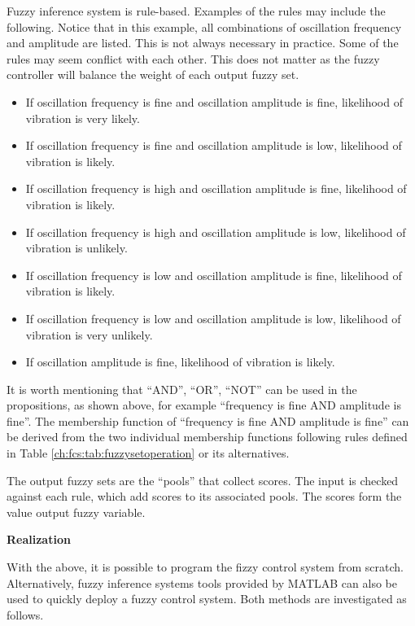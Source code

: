 Fuzzy inference system is rule-based. Examples of the rules may include the following. Notice that in this example, all combinations of oscillation frequency and amplitude are listed. This is not always necessary in practice. Some of the rules may seem conflict with each other. This does not matter as the fuzzy controller will balance the weight of each output fuzzy set.
\begin{itemize}
	\item If oscillation frequency is fine and oscillation amplitude is fine, likelihood of vibration is very likely.
	\item If oscillation frequency is fine and oscillation amplitude is low, likelihood of vibration is likely.
	\item If oscillation frequency is high and oscillation amplitude is fine, likelihood of vibration is likely.
	\item If oscillation frequency is high and oscillation amplitude is low, likelihood of vibration is unlikely.
	\item If oscillation frequency is low and oscillation amplitude is fine, likelihood of vibration is likely.
	\item If oscillation frequency is low and oscillation amplitude is low, likelihood of vibration is very unlikely.
	\item If oscillation amplitude is fine, likelihood of vibration is likely.
\end{itemize}

It is worth mentioning that ``AND'', ``OR'', ``NOT'' can be used in the propositions, as shown above, for example ``frequency is fine AND amplitude is fine''. The membership function of ``frequency is fine AND amplitude is fine'' can be derived from the two individual membership functions following rules defined in Table \ref{ch:fcs:tab:fuzzysetoperation} or its alternatives.

The output fuzzy sets are the ``pools'' that collect scores. The input is checked against each rule, which add scores to its associated pools. The scores form the value output fuzzy variable.

\vspace{0.1in}
\noindent \textbf{Realization}
\vspace{0.1in}

With the above, it is possible to program the fizzy control system from scratch. Alternatively, fuzzy inference systems tools provided by MATLAB can also be used to quickly deploy a fuzzy control system. Both methods are investigated as follows.

